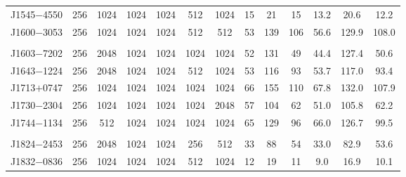 \documentclass[useAMS,usenatbib]{mn2e}
\begin{document}
\begin{table}
\begin{center}
\begin{tabular}{lcccccccccccc}
J1545$-$4550&  256    &    1024         &   1024   &  1024   &  512        &  1024    &  15     &  21         & 15       &  13.2   &    20.6          &  12.2   \\ 
J1600$-$3053&  256    &    1024         &   1024   &  1024   &  512        &  512     &  53     &  139        & 106      &  56.6   &    129.9         &  108.0   \\ 
						&         &                 &          &         &             &          &         &             &          &         &                  &          \\
J1603$-$7202&  256    &    2048         &   1024   &  1024   &  1024       &  1024    &  52     &  131        & 49       &  44.4   &    127.4         &  50.6    \\ 
J1643$-$1224&  256    &    2048         &   1024   &  1024   &  512        &  1024    &  53     &  116        & 93       &  53.7   &    117.0         &  93.4     \\ 
J1713$+$0747&  256    &    1024         &   1024   &  1024   &  1024       &  1024    &  66     &  155        & 110      &  67.8   &    132.0         &  107.9    \\ 
J1730$-$2304&  256    &    1024         &   1024   &  1024   &  1024       &  2048    &  57     &  104        & 62       &  51.0   &    105.8         &  62.2    \\ 
%
J1744$-$1134&  256    &    512          &   1024   &  1024   &  1024       &  1024    &  65     &  129        & 96       &  66.0   &    126.7         &  99.5    \\ 
						&         &                 &          &         &             &          &         &             &          &         &                  &          \\
J1824$-$2453&  256    &    2048         &   1024   &  1024   &  256        &  512     &  33     &  88         & 54       &  33.0   &    82.9          &  53.6    \\ 
J1832$-$0836&  256    &    1024         &   1024   &  1024   &  512        &  1024    &  12     &  19         & 11       &  9.0    &    16.9          &  10.1    \\ 

\end{tabular}
\end{center}
\end{table}
\end{document}
